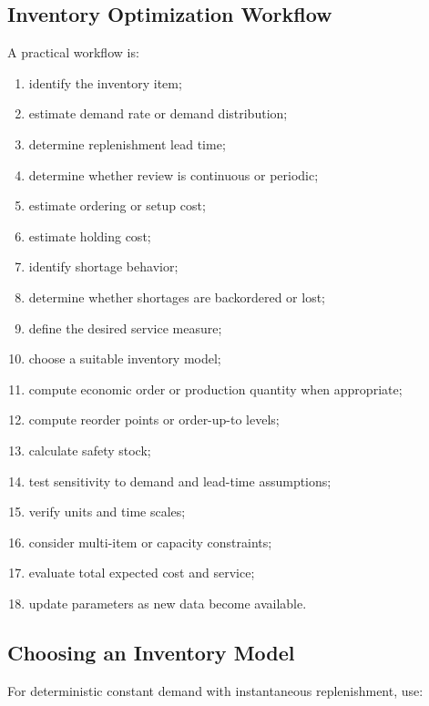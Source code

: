 \subsection{Inventory Optimization Workflow}
\label{subsec:inventory-workflow}

A practical workflow is:

\begin{enumerate}
    \item identify the inventory item;
    \item estimate demand rate or demand distribution;
    \item determine replenishment lead time;
    \item determine whether review is continuous or periodic;
    \item estimate ordering or setup cost;
    \item estimate holding cost;
    \item identify shortage behavior;
    \item determine whether shortages are backordered or lost;
    \item define the desired service measure;
    \item choose a suitable inventory model;
    \item compute economic order or production quantity when appropriate;
    \item compute reorder points or order-up-to levels;
    \item calculate safety stock;
    \item test sensitivity to demand and lead-time assumptions;
    \item verify units and time scales;
    \item consider multi-item or capacity constraints;
    \item evaluate total expected cost and service;
    \item update parameters as new data become available.
\end{enumerate}

\subsection{Choosing an Inventory Model}
\label{subsec:choosing-inventory-model}

For deterministic constant demand with instantaneous replenishment, use:

